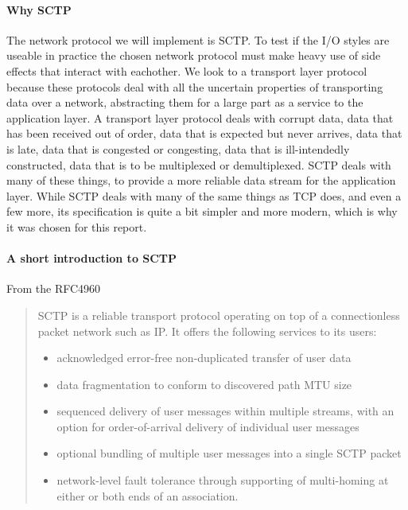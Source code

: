 \paragraph{Why SCTP}
The network protocol we will implement is SCTP.
To test if the I/O styles are useable in practice the chosen network protocol must make heavy use of side effects that interact with eachother.
We look to a transport layer protocol because these protocols deal with all the uncertain properties of transporting data over a network, abstracting them for a large part as a service to the application layer.
A transport layer protocol deals with corrupt data, data that has been received out of order, data that is expected but never arrives, data that is late, data that is congested or congesting, data that is ill-intendedly constructed, data that is to be multiplexed or demultiplexed.
SCTP deals with many of these things, to provide a more reliable data stream for the application layer.
While SCTP deals with many of the same things as TCP does, and even a few more, its specification is quite a bit simpler and more modern, which is why it was chosen for this report.
\paragraph{A short introduction to SCTP}
From the RFC4960\cite{_rfc_????}
\begin{quotation}
SCTP is a reliable transport protocol operating on top of a
   connectionless packet network such as IP.  It offers the following
   services to its users:
\begin{itemize}

   \item  acknowledged error-free non-duplicated transfer of user data

   \item data fragmentation to conform to discovered path MTU size

   \item sequenced delivery of user messages within multiple streams, with
       an option for order-of-arrival delivery of individual user
       messages

   \item optional bundling of multiple user messages into a single SCTP
       packet

   \item network-level fault tolerance through supporting of multi-homing
       at either or both ends of an association.
\end{itemize}
\end{quotation}
